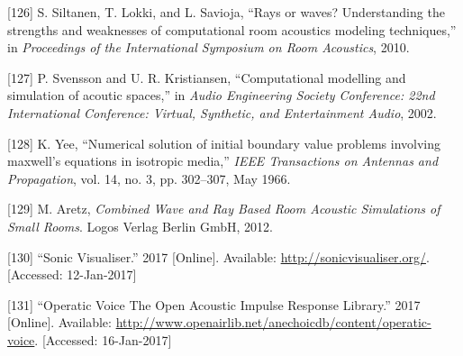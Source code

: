 \documentclass[]{scrreprt}
\begin{document}
\hypertarget{ref-siltanenux5fraysux5f2010}{}
{[}126{]} S. Siltanen, T. Lokki, and L. Savioja, ``Rays or waves?
Understanding the strengths and weaknesses of computational room
acoustics modeling techniques,'' in \emph{Proceedings of the
International Symposium on Room Acoustics}, 2010.

\hypertarget{ref-svenssonux5fcomputationalux5f2002}{}
{[}127{]} P. Svensson and U. R. Kristiansen, ``Computational modelling
and simulation of acoutic spaces,'' in \emph{Audio Engineering Society
Conference: 22nd International Conference: Virtual, Synthetic, and
Entertainment Audio}, 2002.

\hypertarget{ref-yeeux5fnumericalux5f1966}{}
{[}128{]} K. Yee, ``Numerical solution of initial boundary value
problems involving maxwell's equations in isotropic media,'' \emph{IEEE
Transactions on Antennas and Propagation}, vol. 14, no. 3, pp. 302--307,
May 1966.

\hypertarget{ref-aretzux5fcombinedux5f2012}{}
{[}129{]} M. Aretz, \emph{Combined Wave and Ray Based Room Acoustic
Simulations of Small Rooms}. Logos Verlag Berlin GmbH, 2012.

\hypertarget{ref-ux5fsonicux5f2017}{}
{[}130{]} ``Sonic Visualiser.'' 2017 {[}Online{]}. Available:
\url{http://sonicvisualiser.org/}. {[}Accessed: 12-Jan-2017{]}

\hypertarget{ref-ux5foperaticux5f2017}{}
{[}131{]} ``Operatic Voice The Open Acoustic Impulse Response Library.''
2017 {[}Online{]}. Available:
\url{http://www.openairlib.net/anechoicdb/content/operatic-voice}.
{[}Accessed: 16-Jan-2017{]}
\end{document}
